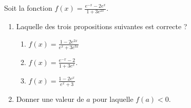 
\begin{exercice}\label{exosmath-0416}

    Soit la fonction \( f(x)=\frac{ \displaystyle  e^{-x}-2 e^{x} }{ \displaystyle 1+3 e^{2x} }\).
    \begin{enumerate}
        \item
            Laquelle des trois propositions suivantes est correcte ?
            \begin{enumerate}
                \item
                    \( f(x)=\frac{ 1-2 e^{2x} }{  e^{x} +3 e^{3x}  }\)
                \item
                    \( f(x)=\frac{  e^{-x}-2 }{ 1+3 e^{x} }\).
                \item
                    \( f(x)=\frac{ 1-2 e^{x} }{  e^{x}+3 }\)
            \end{enumerate}
        \item
            Donner une valeur de \( a\) pour laquelle \( f(a)<0\).
    \end{enumerate}

\end{exercice}
